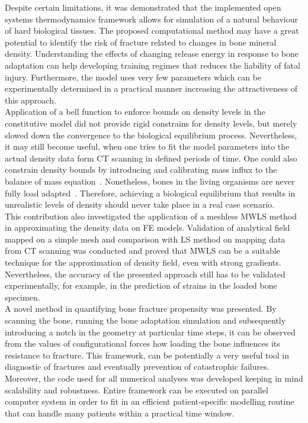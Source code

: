 \documentclass[review]{elsarticle}
\numberwithin{equation}{section}
\begin{document}
Despite certain limitations, it was demonstrated that the implemented open systems thermodynamics framework allows for simulation of a natural behaviour of hard biological tissues. 
The proposed computational method may have a great potential to identify the risk of fracture related to changes in bone mineral density. 
Understanding the effects of changing release energy in response to bone adaptation can help developing training regimes that reduces the liability of fatal injury. 
Furthermore, the model uses very few parameters which can be experimentally determined in a practical manner increasing the attractiveness of this approach.\\ 

Application of a bell function to enforce bounds on density levels in the constitutive model did not provide rigid constrains for density levels, but merely slowed down the convergence to the biological equilibrium process. 
Nevertheless, it may still become useful, when one tries to fit the model parameters into the actual density data form CT scanning in defined periods of time. 
One could also constrain density bounds by introducing and calibrating mass influx to the balance of mass equation~\citep{sharma2013adaptive}. 
Nonetheless, bones in the living organisms are never fully load adapted~\citep{christen2014bone}. 
Therefore, achieving a biological equilibrium that results in unrealistic levels of density should never take place in a real case scenario. \\

This contribution also investigated the application of a meshless MWLS method in approximating the density data on FE models. Validation of analytical field mapped on a simple mesh and comparison with LS method on mapping data from CT scanning was conducted and proved that MWLS can be a suitable technique for the approximation of density field, even with strong gradients. 
Nevertheless, the accuracy of the presented approach still has to be validated experimentally, for example, in the prediction of strains in the loaded bone specimen.  \\

A novel method in quantifying bone fracture propensity was presented. By scanning the bone, running the bone adaptation simulation and subsequently introducing a notch in the geometry at particular time steps, it can be observed from the values of configurational forces how loading the bone influences its resistance to fracture. 
This framework, can be potentially a very useful tool in diagnostic of fractures and eventually prevention of catastrophic failures. 
Moreover, the code used for all numerical analyses was developed keeping in mind scalability and robustness. 
Entire framework can be executed on parallel computer system in order to fit in an efficient patient-specific modelling routine that can handle many patients within a practical time window. \\
\end{document}
